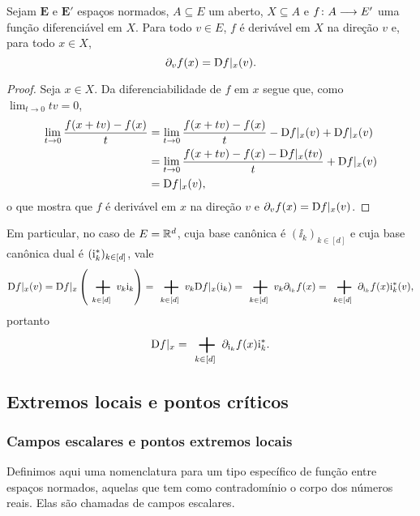 \begin{proposition}
Sejam $\bm E$ e $\bm E'$ espaços normados, $A \subseteq E$ um aberto, $X \subseteq A$ e $f\colon \allowbreak A \longrightarrow E'$ uma função diferenciável em $X$. Para todo $v \in E$, $f$ é derivável em $X$ na direção $v$ e, para todo $x \in X$,
	\begin{equation*}
	\partial_{v} f(x) = \mathrm{D} f|_x(v).
	\end{equation*}
\end{proposition}
\begin{proof}
Seja $x \in X$. Da diferenciabilidade de $f$ em $x$ segue que, como $\lim_{t \to 0} tv = 0$,
	\begin{align*}
	\lim_{t \to 0} \frac{f(x+tv) - f(x)}{t} &= \lim_{t \to 0} \frac{f(x+tv) - f(x)}{t} - \mathrm{D} f|_x(v) + \mathrm{D} f|_x(v) \\
		&= \lim_{t \to 0} \frac{f(x+tv) - f(x) - \mathrm{D} f|_x(tv)}{t} + \mathrm{D} f|_x(v) \\
		&= \mathrm{D} f|_x(v),
	\end{align*}
o que mostra que $f$ é derivável em $x$ na direção $v$ e $\partial_{v} f(x) = \mathrm{D} f|_x(v)$.
\end{proof}

Em particular, no caso de $E = \mathbb{R}^d$, cuja base canônica é $(\ii_k)_{k \in [d]}$ e cuja base canônica dual é $(\mathrm{i}_k^{\ast})_{k \in [d]}$, vale
	\begin{equation*}
	\D f|_x(v) = \D f|_x \left( \sum_{k \in [d]} v_k \ii_k \right) = \sum_{k \in [d]} v_k \D f|_x(\ii_k) = \sum_{k \in [d]} v_k \dir{\ii_k} f(x) = \sum_{k \in [d]} \dir{\ii_k} f(x)\ii_k\dual(v),
	\end{equation*}
portanto
	\begin{equation*}
	\D f|_x = \sum_{k \in [d]} \dir{\ii_k} f(x) \ii_k\dual.
	\end{equation*}


\subsection{Extremos locais e pontos críticos}
\label{ssec:extremos.locais.pontos.criticos}

\subsubsection{Campos escalares e pontos extremos locais}

Definimos aqui uma nomenclatura para um tipo específico de função entre espaços normados, aquelas que tem como contradomínio o corpo dos números reais. Elas são chamadas de campos escalares.


